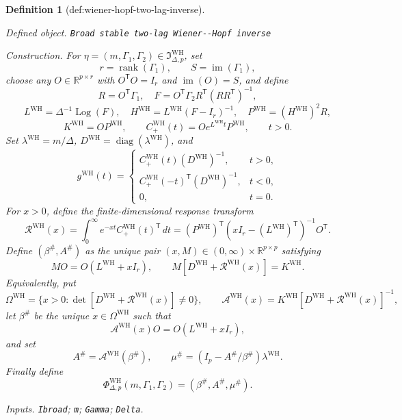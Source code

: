 \documentclass{article}
\newtheorem{definition}{Definition}
\begin{document}
\begin{definition}[def:wiener-hopf-two-lag-inverse]\label{def:wiener-hopf-two-lag-inverse}
\par\smallskip\noindent\emph{Defined object.} \texttt{Broad stable two-\allowbreak{}lag Wiener-\allowbreak{}-\allowbreak{}Hopf inverse}
\par\smallskip\noindent\emph{Construction.} For \(\eta=(m,\Gamma_1,\Gamma_2)\in\mathfrak I_{\Delta,p}^{\mathrm{WH}}\), set
\[
 r=\operatorname{rank}(\Gamma_1),\qquad S=\operatorname{im}(\Gamma_1),
\]
choose any \(O\in\mathbb R^{p\times r}\) with \(O^{\mathsf T}O=I_r\) and \(\operatorname{im}(O)=S\), and define
\[
 R=O^{\mathsf T}\Gamma_1,\quad
 F=O^{\mathsf T}\Gamma_2R^{\mathsf T}(RR^{\mathsf T})^{-1},
\]
\[
 L^{\mathrm{WH}}=\Delta^{-1}\operatorname{Log}(F),\quad
 H^{\mathrm{WH}}=L^{\mathrm{WH}}(F-I_r)^{-1},\quad
 P^{\mathrm{WH}}=(H^{\mathrm{WH}})^2R,
\]
\[
 K^{\mathrm{WH}}=OP^{\mathrm{WH}},\qquad
 C_{+}^{\mathrm{WH}}(t)=Oe^{L^{\mathrm{WH}}t}P^{\mathrm{WH}},\qquad t>0.
\]
Set \(\lambda^{\mathrm{WH}}=m/\Delta\), \(D^{\mathrm{WH}}=\operatorname{diag}(\lambda^{\mathrm{WH}})\), and
\[
 g^{\mathrm{WH}}(t)=
 \begin{cases}
 C_{+}^{\mathrm{WH}}(t)(D^{\mathrm{WH}})^{-1},&t>0,\\
 C_{+}^{\mathrm{WH}}(-t)^{\mathsf T}(D^{\mathrm{WH}})^{-1},&t<0,\\
 0,&t=0.
 \end{cases}
\]
For \(x>0\), define the finite-dimensional response transform
\[
 \mathcal R^{\mathrm{WH}}(x)
 =\int_0^\infty e^{-xt}C_{+}^{\mathrm{WH}}(t)^{\mathsf T}\,dt
 =(P^{\mathrm{WH}})^{\mathsf T}(xI_r-(L^{\mathrm{WH}})^{\mathsf T})^{-1}O^{\mathsf T}.
\]
Define \((\beta^{\#},A^{\#})\) as the unique pair \((x,M)\in(0,\infty)\times\mathbb R^{p\times p}\) satisfying
\[
 MO=O(L^{\mathrm{WH}}+xI_r),\qquad
 M[D^{\mathrm{WH}}+\mathcal R^{\mathrm{WH}}(x)]=K^{\mathrm{WH}}.
\]
Equivalently, put
\[
 \Omega^{\mathrm{WH}}
 =\{x>0:\det[D^{\mathrm{WH}}+\mathcal R^{\mathrm{WH}}(x)]\neq0\},
\qquad
 \mathcal A^{\mathrm{WH}}(x)
 =K^{\mathrm{WH}}[D^{\mathrm{WH}}+\mathcal R^{\mathrm{WH}}(x)]^{-1},
\]
let \(\beta^{\#}\) be the unique \(x\in\Omega^{\mathrm{WH}}\) such that
\[
 \mathcal A^{\mathrm{WH}}(x)O=O(L^{\mathrm{WH}}+xI_r),
\]
and set
\[
 A^{\#}=\mathcal A^{\mathrm{WH}}(\beta^{\#}),\qquad
 \mu^{\#}=(I_p-A^{\#}/\beta^{\#})\lambda^{\mathrm{WH}}.
\]
Finally define
\[
 \Phi_{\Delta,p}^{\mathrm{WH}}(m,\Gamma_1,\Gamma_2)
 =(\beta^{\#},A^{\#},\mu^{\#}).
\]
\par\smallskip\noindent\emph{Inputs.} \texttt{Ibroad}; \texttt{m}; \texttt{Gamma}; \texttt{Delta}.
\end{definition}
\end{document}
